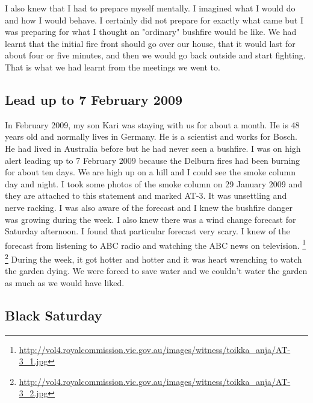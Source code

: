 \documentclass[a4paper]{article}
\begin{document}
        I also knew that I had to prepare myself mentally. I imagined what I would do and how I would behave. I certainly did not prepare for exactly what came but I was preparing for what I thought an "ordinary" bushfire would be like. We had learnt that the initial fire front should go over our house, that it would last for about four or five minutes, and then we would go back outside and start fighting. That is what we had learnt from the meetings we went to.

    \subsection{Lead up to 7 February 2009}

        In February 2009, my son Kari was staying with us for about a month. He is 48 years old and normally lives in Germany. He is a scientist and works for Bosch. He had lived in Australia before but he had never seen a bushfire.
        I was on high alert leading up to 7 February 2009 because the Delburn fires had been burning for about ten days. We are high up on a hill and I could see the smoke column day and night. I took some photos of the smoke column on 29 January 2009 and they are attached to this statement and marked AT-3. It was unsettling and nerve racking. I was also aware of the forecast and I knew the bushfire danger was growing during the week. I also knew there was a wind change forecast for Saturday afternoon. I found that particular forecast very scary. I knew of the forecast from listening to ABC radio and watching the ABC news on television.
        \footnote{\url{http://vol4.royalcommission.vic.gov.au/images/witness/toikka_anja/AT-3_1.jpg}}
        \footnote{\url{http://vol4.royalcommission.vic.gov.au/images/witness/toikka_anja/AT-3_2.jpg}}
        During the week, it got hotter and hotter and it was heart wrenching to watch the garden dying. We were forced to save water and we couldn't water the garden as much as we would have liked.

    \subsection{Black Saturday}
\end{document}
